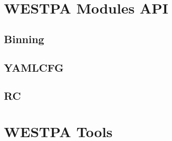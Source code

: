 \documentclass[letterpaper,10pt,english]{sphinxmanual}
\begin{document}
\section{WESTPA Modules API}
\label{\detokenize{development/api:westpa-modules-api}}\label{\detokenize{development/api::doc}}

\subsection{Binning}
\label{\detokenize{development/api:binning}}

\subsection{YAMLCFG}
\label{\detokenize{development/api:yamlcfg}}

\subsection{RC}
\label{\detokenize{development/api:rc}}

\section{WESTPA Tools}
\label{\detokenize{development/api:westpa-tools}}


\renewcommand{\indexname}{Index}
\printindex
\end{document}
